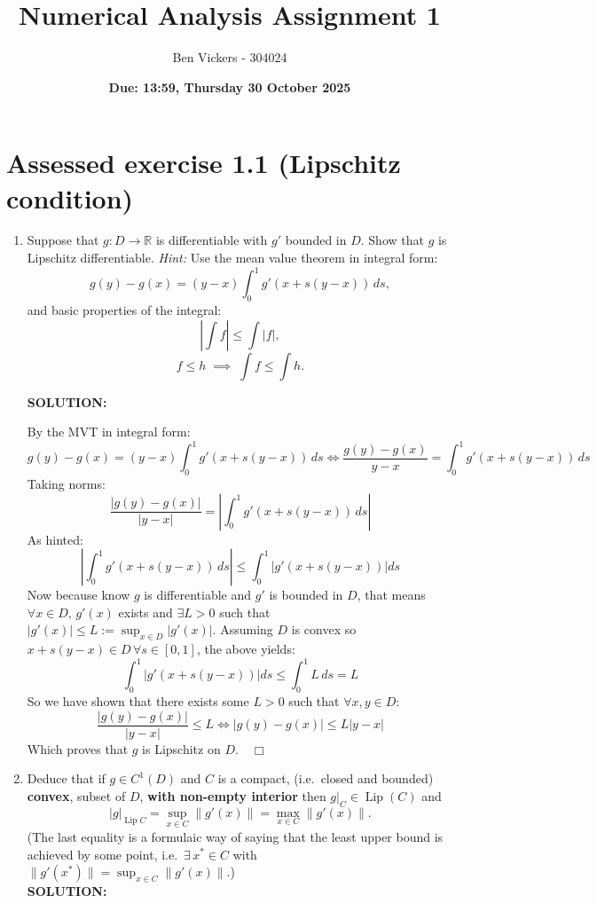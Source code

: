 \documentclass[]{article}
\title{\textbf{Numerical Analysis Assignment 1}}
\author{Ben Vickers - 304024}
\date{\textbf{Due: 13:59, Thursday 30 October 2025}}
\begin{document}
	\maketitle
\noindent \section*{Assessed exercise 1.1 (Lipschitz condition)}
\begin{enumerate}
\item Suppose that $g\colon D \to \mathbb{R}$ is differentiable with $g'$ bounded in $D$. Show that $g$ is Lipschitz differentiable. \textit{Hint:} Use the mean value theorem in integral form:
\[
\displaystyle g(y)-g(x)=(y-x)\int_{0}^{1} g'(x+s(y-x))\,ds,\tag{1}
\]
and basic properties of the integral:
\[
\displaystyle \left|\int f\right| \le \int |f|,\tag{2}
\]
\[
\displaystyle f \le h \;\implies\; \int f \le \int h.\tag{3}
\]

\noindent \textbf{SOLUTION:}

By the MVT in integral form:
\[
\displaystyle g(y)-g(x)=(y-x)\int_{0}^{1} g'(x+s(y-x))\,ds \iff \displaystyle \frac{g(y)-g(x)}{y-x}=\int_{0}^{1} g'(x+s(y-x))\,ds
\]
Taking norms:
\[
 \displaystyle \frac{\left|g(y)-g(x)\right|}{\left|y-x\right|}= \left| \int_{0}^{1} g'(x+s(y-x))\,ds \right|
\]
As hinted:
\[
\left| \int_{0}^{1} g'(x+s(y-x))\,ds \right| \leq \int_{0}^{1}  \left|g'(x+s(y-x)) \right| ds
\]
Now because know $g$ is differentiable and $g'$ is bounded in $D$, that means $ \forall x \in D,\, g'(x)$ exists and $\exists L > 0$ such that $\left|g'(x)\right| \leq L := \displaystyle\sup_{x\in D}\left|g'(x)\right|.$ Assuming $D$ is convex so $x+s(y-x) \in D \, \forall s\in[0,1]$, the above yields:
\[
 \int_{0}^{1}  \left|g'(x+s(y-x)) \right| ds \leq  \int_{0}^{1} L\, ds = L
\]
So we have shown that there exists some $L>0$ such that $\forall x,y \in D$:
\[
\frac{\left|g(y)-g(x)\right|}{\left|y-x\right|} \leq L \iff \left|g(y)-g(x)\right| \leq L\left|y-x\right|
\]
Which proves that $g$ is Lipschitz on $D. \quad \Box$ 

\item Deduce that if $g \in C^{1}(D)$ and $C$ is a compact, (i.e.\ closed and bounded) \textbf{convex}, subset of $D$, \textbf{with non-empty interior} then $g|_{C} \in \operatorname{Lip}(C)$ and
\[
\displaystyle |g|_{\operatorname{Lip} C}=\sup_{x\in C}\|g'(x)\|=\max_{x\in C}\|g'(x)\|.\tag{4}
\]
(The last equality is a formulaic way of saying that the least upper bound is achieved by some point, i.e.\ $\exists\,x^{*}\in C$ with $\|g'(x^{*})\|=\sup_{x\in C}\|g'(x)\|$.)
\[\]
\noindent \textbf{SOLUTION:}


\end{enumerate}
\end{document}
